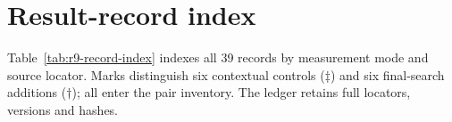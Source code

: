 \section{Result-record index}\label{app:records}
Table~\ref{tab:r9-record-index} indexes all 39 records by measurement mode and source locator. Marks distinguish six contextual controls ($\ddagger$) and six final-search additions ($\dagger$); all enter the pair inventory. The ledger retains full locators, versions and hashes.
